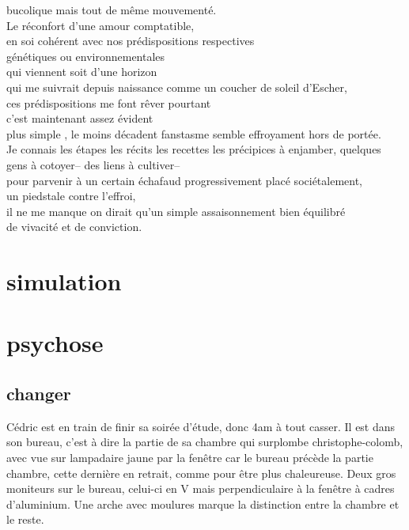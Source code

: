 \documentclass{article}
\begin{document}
bucolique mais tout de même mouvementé.\\
Le réconfort d'une amour comptatible,\\
en soi cohérent avec nos prédispositions respectives\\
génétiques  ou environnementales\\
qui viennent soit d'une horizon\\
qui me suivrait depuis naissance comme un coucher de soleil d'Escher,\\
ces prédispositions me font rêver pourtant \\
c'est maintenant assez évident\\
plus simple , le moins décadent fanstasme semble effroyament hors de portée.\\
Je connais les étapes les récits les recettes les précipices à enjamber, quelques\\
gens à cotoyer-- des liens à cultiver-- \\
pour parvenir à un certain échafaud
progressivement placé sociétalement, \\
un piedstale contre l'effroi,\\
il ne me manque on dirait qu'un simple assaisonnement bien équilibré\\
de vivacité et de conviction.\\

\clearpage

\section{simulation}

\clearpage

\section{psychose}
\subsection{changer}
Cédric est en train de finir sa soirée d'étude, donc 4am à tout casser. Il est
dans son bureau, c'est à dire la partie de sa chambre qui surplombe
christophe-colomb, avec vue sur lampadaire jaune par la fenêtre car le bureau
précède la partie chambre, cette dernière en retrait, comme pour être plus
chaleureuse. Deux gros moniteurs sur le bureau, celui-ci en V mais
perpendiculaire à la fenêtre à cadres d'aluminium. Une arche avec moulures
marque la distinction entre la chambre et le reste. \\
\end{document}

